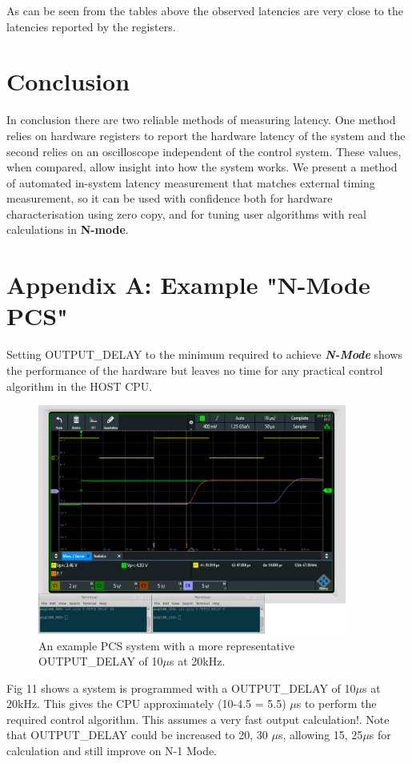 \documentclass{article}
\begin{document}
As can be seen from the tables above the observed latencies are very close to the latencies reported by the registers.

\section{Conclusion}
In conclusion there are two reliable methods of measuring latency.
One method relies on hardware registers to report the hardware latency of the system and the second relies on an oscilloscope independent of the control system.
These values, when compared, allow insight into how the system works.
We present a method of automated in-system latency measurement that matches external timing measurement, so it can be used with confidence both for hardware characterisation using zero copy, and for tuning user algorithms with real calculations in \textbf{N-mode}.

\section{Appendix A: Example "N-Mode PCS"}

Setting OUTPUT\_DELAY to the minimum required to achieve \textit{\textbf{N-Mode}} shows the performance of the hardware but leaves no time for any practical control algorithm in the HOST CPU.

\begin{figure}
	\centering
	\includegraphics[width=4.0in]{images/n-mode-pcs-scope-trace-20kHz.png}
	\caption{An example PCS system with a more representative OUTPUT\_DELAY of 10$\mu$s at 20kHz.}
	\label{}
\end{figure}

Fig 11 shows a system is programmed with a OUTPUT\_DELAY of 10$\mu$s at 20kHz.
This gives the CPU approximately (10-4.5 = 5.5) $\mu$s to perform the required control algorithm.
This assumes a very fast output calculation!.
Note that OUTPUT\_DELAY could be increased to 20, 30 $\mu$s, allowing 15, 25$\mu$s for calculation and still improve on N-1 Mode.
\end{document}
